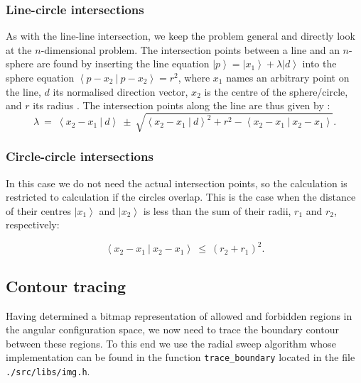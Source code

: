 \subsubsection*{Line-circle intersections}
As with the line-line intersection, we keep the problem general and directly look at the $n$-dimensional problem.
The intersection points between a line and an $n$-sphere are found by inserting the line equation 
$\left|p\right> = \left|x_1\right> + \lambda \left|d\right>$ into the sphere equation 
$\left< p-x_2 \ |\  p-x_2 \right> = r^2$, where $x_1$ names an arbitrary point on the line, $d$ its normalised 
direction vector, $x_2$ is the centre of the sphere/circle, and $r$ its radius \cite{wiki_line_sphere_intersection}.
The intersection points along the line are thus given by \cite{wiki_line_sphere_intersection}:
\begin{equation}
	\lambda \ =\ \left< x_2 - x_1 \  |\  d \right>
		\ \pm\ \sqrt{ \left< x_2 - x_1 \  |\  d \right>^2 
			+ r^2 - \left< x_2 - x_1 \ |\  x_2 - x_1 \right>}.
\end{equation}



\subsubsection*{Circle-circle intersections}
In this case we do not need the actual intersection points, so the calculation is restricted to calculation if
the circles overlap. This is the case when the distance of their centres $\left| x_1 \right>$ and $\left| x_2 \right>$ 
is less than the sum of their radii, $r_1$ and $r_2$, respectively:

\begin{equation}
	\left< x_2 - x_1 \ |\ x_2 - x_1  \right> \ \leq \ \left( r_2 + r_1 \right)^2.
\end{equation}



\subsection{Contour tracing}
Having determined a bitmap representation of allowed and forbidden regions in the angular configuration space,
we now need to trace the boundary contour between these regions.
To this end we use the radial sweep algorithm \cite{web_radial_sweep} whose implementation can be found
in the function \lstinline[language=C++]|trace_boundary| located in the file \lstinline|./src/libs/img.h|.

